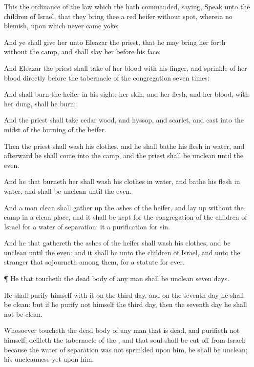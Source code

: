 {This
{} the
ordinance of the
law which the
{} hath
commanded,
saying,
Speak unto the
children of
Israel, that they
bring thee a
red
heifer without
spot, wherein
{} no
blemish,
{} upon which
never
came
yoke:

And ye shall
give her unto
Eleazar the
priest, that he may bring her
forth
without the
camp, and
{} shall
slay her
before his face:

And
Eleazar the
priest shall
take of her
blood with his
finger, and
sprinkle of her
blood
directly
before the
tabernacle of the
congregation
seven
times:

And
{} shall
burn the
heifer in his
sight; her
skin, and her
flesh, and her
blood, with her
dung, shall he
burn:

And the
priest shall
take
cedar
wood, and
hyssop, and
scarlet, and
cast
{} into the
midst of the
burning of the
heifer.

Then the
priest shall
wash his
clothes, and he shall
bathe his
flesh in
water, and
afterward he shall
come into the
camp, and the
priest shall be
unclean until the
even.

And he that
burneth her shall
wash his
clothes in
water, and
bathe his
flesh in
water, and shall be
unclean until the
even.

And a
man
{}
clean shall
gather up the
ashes of the
heifer, and lay
{}
up
without the
camp in a
clean
place, and it shall be
kept for the
congregation of the
children of
Israel for a
water of
separation: it
{} a purification for
sin.

And he that
gathereth the
ashes of the
heifer shall
wash his
clothes, and be
unclean until the
even: and it shall be unto the
children of
Israel, and unto the
stranger that
sojourneth
among them, for a
statute for
ever.


\par }{\PP {}¶ He that
toucheth the
dead
body of any
man shall be
unclean
seven
days.

He shall
purify himself with it on the
third
day, and on the
seventh
day he shall be
clean: but if he
purify not himself the
third
day, then the
seventh
day he shall not be
clean.

Whosoever
toucheth the
dead
body of any
man that is
dead, and
purifieth not himself,
defileth the
tabernacle of the
{}; and that
soul shall be cut
off from
Israel: because the
water of
separation was not
sprinkled upon him, he shall be
unclean; his
uncleanness
{} yet upon him.

}
